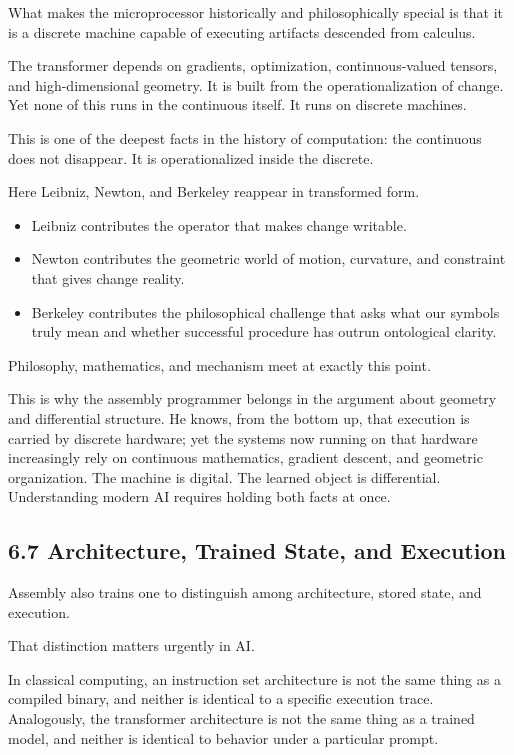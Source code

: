 What makes the microprocessor historically and philosophically special
is that it is a discrete machine capable of executing artifacts
descended from calculus.

The transformer depends on gradients, optimization, continuous-valued
tensors, and high-dimensional geometry. It is built from the
operationalization of change. Yet none of this runs in the continuous
itself. It runs on discrete machines.

This is one of the deepest facts in the history of computation: the
continuous does not disappear. It is operationalized inside the
discrete.

Here Leibniz, Newton, and Berkeley reappear in transformed form.

\begin{itemize}
\tightlist
\item
  Leibniz contributes the operator that makes change writable.
\item
  Newton contributes the geometric world of motion, curvature, and
  constraint that gives change reality.
\item
  Berkeley contributes the philosophical challenge that asks what our
  symbols truly mean and whether successful procedure has outrun
  ontological clarity.
\end{itemize}

Philosophy, mathematics, and mechanism meet at exactly this point.

This is why the assembly programmer belongs in the argument about
geometry and differential structure. He knows, from the bottom up, that
execution is carried by discrete hardware; yet the systems now running
on that hardware increasingly rely on continuous mathematics, gradient
descent, and geometric organization. The machine is digital. The learned
object is differential. Understanding modern AI requires holding both
facts at once.

\hypertarget{architecture-trained-state-and-execution}{%
\subsection{6.7 Architecture, Trained State, and
Execution}\label{architecture-trained-state-and-execution}}

Assembly also trains one to distinguish among architecture, stored
state, and execution.

That distinction matters urgently in AI.

In classical computing, an instruction set architecture is not the same
thing as a compiled binary, and neither is identical to a specific
execution trace. Analogously, the transformer architecture is not the
same thing as a trained model, and neither is identical to behavior
under a particular prompt.


